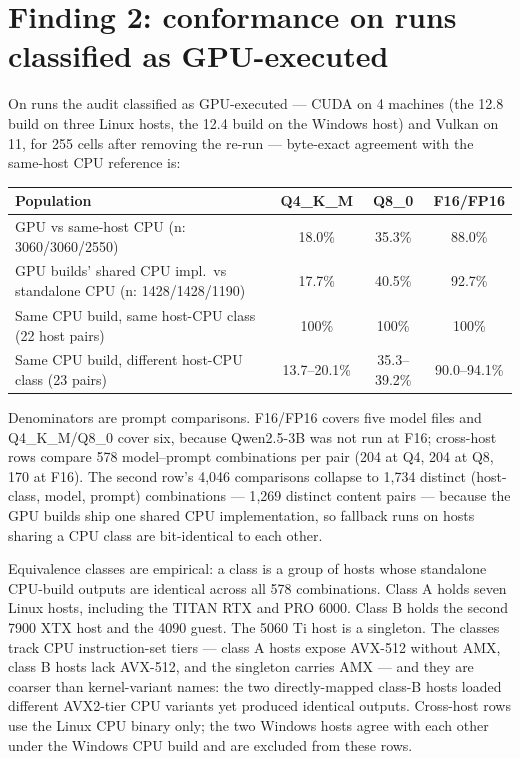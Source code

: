 \documentclass[11pt]{article}
\begin{document}
\section{Finding 2: conformance on runs classified as GPU-executed}\label{sec:conformance}

On runs the audit classified as GPU-executed --- CUDA on 4 machines
(the 12.8 build on three Linux hosts, the 12.4 build on the Windows
host) and Vulkan on 11, for 255 cells after removing the re-run ---
byte-exact agreement with the same-host CPU reference is:

\begin{center}
\footnotesize
\setlength{\tabcolsep}{4pt}
\begin{tabular}{lccc}
\toprule
Population & Q4\_K\_M & Q8\_0 & F16/FP16 \\
\midrule
GPU vs same-host CPU (n: 3060/3060/2550) & 18.0\% & 35.3\% & 88.0\% \\
GPU builds' shared CPU impl.\ vs standalone CPU (n: 1428/1428/1190) & 17.7\% & 40.5\% & 92.7\% \\
Same CPU build, same host-CPU class (22 host pairs) & 100\% & 100\% & 100\% \\
Same CPU build, different host-CPU class (23 pairs) & 13.7--20.1\% & 35.3--39.2\% & 90.0--94.1\% \\
\bottomrule
\end{tabular}
\end{center}

\noindent Denominators are prompt comparisons. F16/FP16 covers five
model files and Q4\_K\_M/Q8\_0 cover six, because Qwen2.5-3B was not
run at F16; cross-host rows compare 578 model--prompt combinations per
pair (204 at Q4, 204 at Q8, 170 at F16). The second row's 4{,}046
comparisons collapse to 1{,}734 distinct (host-class, model, prompt)
combinations --- 1{,}269 distinct content pairs --- because the GPU
builds ship one shared CPU implementation, so fallback runs on hosts
sharing a CPU class are bit-identical to each other.

\noindent Equivalence classes are empirical: a class is a group of
hosts whose standalone CPU-build outputs are identical across all 578
combinations. Class A holds seven Linux hosts, including the TITAN RTX
and PRO 6000. Class B holds the second 7900 XTX host and the 4090
guest. The 5060 Ti host is a singleton. The classes track CPU
instruction-set tiers --- class A hosts expose AVX-512 without AMX,
class B hosts lack AVX-512, and the singleton carries AMX --- and they
are coarser than kernel-variant names: the two directly-mapped class-B
hosts loaded different AVX2-tier CPU variants yet produced identical
outputs. Cross-host rows use the Linux CPU binary only; the two
Windows hosts agree with each other under the Windows CPU build and
are excluded from these rows.
\end{document}
